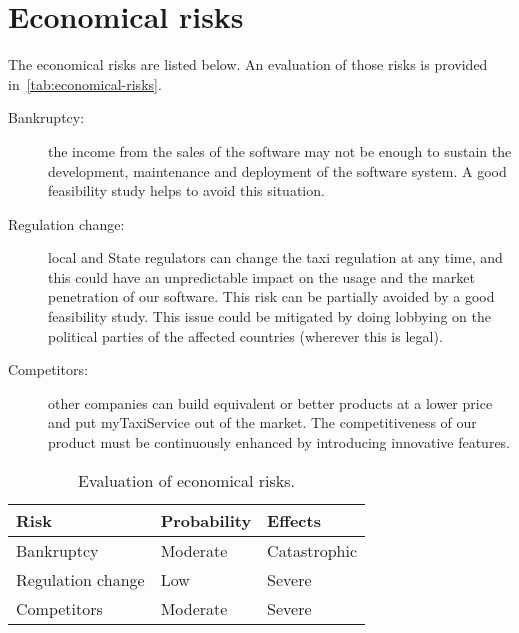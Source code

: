 \section{Economical risks}

The economical risks are listed below. An evaluation of those risks is provided in~\autoref{tab:economical-risks}.

\begin{description}
    \item[Bankruptcy:] the income from the sales of the software may not be enough to sustain the development, maintenance and deployment of the software system. A good feasibility study helps to avoid this situation.

    \item[Regulation change:] local and State regulators can change the taxi regulation at any time, and this could have an unpredictable impact on the usage and the market penetration of our software.
    This risk can be partially avoided by a good feasibility study. This issue could be mitigated by doing lobbying on the political parties of the affected countries (wherever this is legal).

    \item[Competitors:] other companies can build equivalent or better products at a lower price and put myTaxiService out of the market. The competitiveness of our product must be continuously enhanced by introducing innovative features.
\end{description}

\begin{table}[p]
\centering
    \begin{tabular}{| l | l | l |}
        \hline
        \textbf{Risk}       & \textbf{Probability}  & \textbf{Effects}  \\
        \hline
        Bankruptcy          & Moderate              & Catastrophic      \\
        \hline
        Regulation change   & Low                   & Severe            \\
        \hline
        Competitors         & Moderate              & Severe            \\
        \hline
    \end{tabular}
    \caption{Evaluation of economical risks.}
    \label{tab:economical-risks}
\end{table}